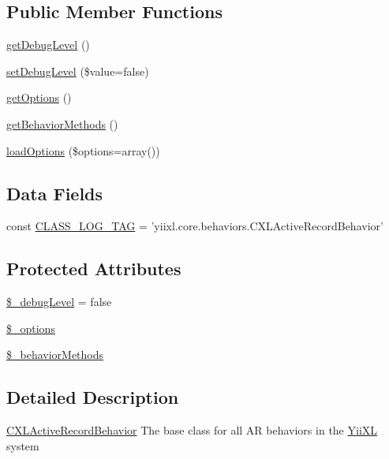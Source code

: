 \subsection*{Public Member Functions}
\begin{DoxyCompactItemize}
\item 
\hyperlink{classCXLActiveRecordBehavior_a122db96cedfc221cf187ce4328f992f7}{getDebugLevel} ()
\item 
\hyperlink{classCXLActiveRecordBehavior_a91ba7d911e2c3852a048f4022c45ec9e}{setDebugLevel} (\$value=false)
\item 
\hyperlink{classCXLActiveRecordBehavior_a1a49b8dded6e91a52e2fd07195d334da}{getOptions} ()
\item 
\hyperlink{classCXLActiveRecordBehavior_a50138660370da467322f8f3965008b14}{getBehaviorMethods} ()
\item 
\hyperlink{classCXLActiveRecordBehavior_ad51d235c20d44a485f9f00f2c86a5ea9}{loadOptions} (\$options=array())
\end{DoxyCompactItemize}
\subsection*{Data Fields}
\begin{DoxyCompactItemize}
\item 
const \hyperlink{classCXLActiveRecordBehavior_aa607ab5e557e6ebb60b85c5a20ad067f}{CLASS\_\-LOG\_\-TAG} = 'yiixl.core.behaviors.CXLActiveRecordBehavior'
\end{DoxyCompactItemize}
\subsection*{Protected Attributes}
\begin{DoxyCompactItemize}
\item 
\hyperlink{classCXLActiveRecordBehavior_aa658930951c1fb5a0640c326c54297c1}{\$\_\-debugLevel} = false
\item 
\hyperlink{classCXLActiveRecordBehavior_ab0cd304a53a2640dc4f15e8d6100612f}{\$\_\-options}
\item 
\hyperlink{classCXLActiveRecordBehavior_a7d3b71fe5a778aaf10f9d65f7717c439}{\$\_\-behaviorMethods}
\end{DoxyCompactItemize}


\subsection{Detailed Description}
\hyperlink{classCXLActiveRecordBehavior}{CXLActiveRecordBehavior} The base class for all AR behaviors in the \hyperlink{classYiiXL}{YiiXL} system 

